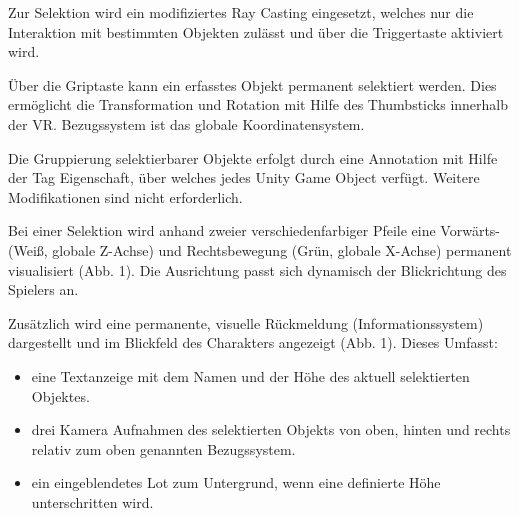 \documentclass[25pt, a0paper, portrait, margin=0mm, innermargin=15mm,blockverticalspace=15mm, colspace=15mm, subcolspace=8mm, ngerman]{tikzposter}
\begin{document}
\begin{columns}
\begin{subcolumns}
{            \vspace{1em}

            Zur Selektion wird ein modifiziertes Ray Casting \cite{Raycast} eingesetzt, welches nur die Interaktion mit bestimmten Objekten zulässt und über die Triggertaste aktiviert wird. 

            \vspace{-2cm}
        }
        
    
        {
            Über die Griptaste kann ein erfasstes Objekt permanent selektiert werden. Dies ermöglicht die Transformation und Rotation mit Hilfe des Thumbsticks innerhalb der VR. Bezugssystem ist das globale Koordinatensystem.
            
            \vspace{1em}
            
            Die Gruppierung selektierbarer Objekte erfolgt durch eine Annotation mit Hilfe der Tag Eigenschaft, über welches jedes Unity Game Object verfügt. Weitere Modifikationen sind nicht erforderlich.
            
            \vspace{1em}
            
            Bei einer Selektion wird anhand zweier verschiedenfarbiger Pfeile eine Vorwärts- (Weiß, globale Z-Achse) und Rechtsbewegung (Grün, globale X-Achse) permanent visualisiert (Abb. 1). Die Ausrichtung passt sich dynamisch der Blickrichtung des Spielers an.
            
            \vspace{1em}
            
            Zusätzlich wird eine permanente, visuelle Rückmeldung (Informationssystem) dargestellt und im Blickfeld des Charakters angezeigt (Abb. 1). Dieses Umfasst:
            
             \begin{itemize}
             
                \item eine Textanzeige mit dem Namen und der Höhe des aktuell selektierten Objektes. 
                \item drei Kamera Aufnahmen des selektierten Objekts von oben, hinten und rechts relativ zum oben genannten Bezugssystem. 
                \item ein eingeblendetes Lot zum Untergrund, wenn eine definierte Höhe unterschritten wird.
            

\end{itemize}}
\end{subcolumns}
\end{columns}
\end{document}
